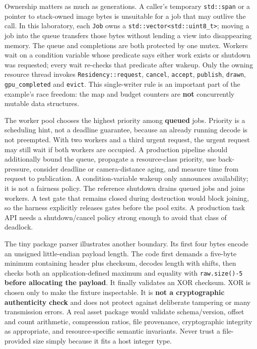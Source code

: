 Ownership matters as much as generations. A caller's temporary \texttt{std::span} or a pointer to stack-owned image bytes is unsuitable for a job that may outlive the call. In this laboratory, each \texttt{Job} owns a \texttt{std::vector\textless{}std::uint8\_t\textgreater{}}; moving a job into the queue transfers those bytes without lending a view into disappearing memory. The queue and completions are both protected by one mutex. Workers wait on a condition variable whose predicate says either work exists or shutdown was requested; every wait re-checks that predicate after wakeup. Only the owning resource thread invokes \texttt{Residency::request}, \texttt{cancel}, \texttt{accept}, \texttt{publish}, \texttt{drawn}, \texttt{gpu\_completed} and \texttt{evict}. This single-writer rule is an important part of the example's race freedom: the map and budget counters are \textbf{not} concurrently mutable data structures.

The worker pool chooses the highest priority among \textbf{queued} jobs. Priority is a scheduling hint, not a deadline guarantee, because an already running decode is not preempted. With two workers and a third urgent request, the urgent request may still wait if both workers are occupied. A production pipeline should additionally bound the queue, propagate a resource-class priority, use back-pressure, consider deadline or camera-distance aging, and measure time from request to publication. A condition-variable wakeup only announces availability; it is not a fairness policy. The reference shutdown drains queued jobs and joins workers. A test gate that remains closed during destruction would block joining, so the harness explicitly releases gates before the pool exits. A production task API needs a shutdown/cancel policy strong enough to avoid that class of deadlock.

The tiny package parser illustrates another boundary. Its first four bytes encode an unsigned little-endian payload length. The code first demands a five-byte minimum containing header plus checksum, decodes length with shifts, then checks both an application-defined maximum and equality with \texttt{raw.size()-5} \textbf{before allocating the payload}. It finally validates an XOR checksum. XOR is chosen only to make the fixture inspectable. It is \textbf{not a cryptographic authenticity check} and does not protect against deliberate tampering or many transmission errors. A real asset package would validate schema/version, offset and count arithmetic, compression ratios, file provenance, cryptographic integrity as appropriate, and resource-specific semantic invariants. Never trust a file-provided size simply because it fits a host integer type.


